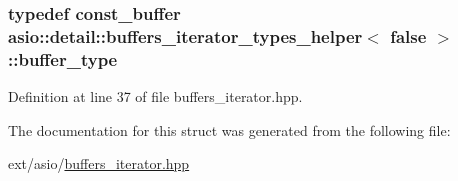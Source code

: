 \subsubsection[{buffer\+\_\+type}]{\setlength{\rightskip}{0pt plus 5cm}typedef {\bf const\+\_\+buffer} {\bf asio\+::detail\+::buffers\+\_\+iterator\+\_\+types\+\_\+helper}$<$ false $>$\+::{\bf buffer\+\_\+type}}\label{structasio_1_1detail_1_1buffers__iterator__types__helper_3_01false_01_4_ab4d0d844258fc4683e4c9922a99b963e}


Definition at line 37 of file buffers\+\_\+iterator.\+hpp.



The documentation for this struct was generated from the following file\+:\begin{DoxyCompactItemize}
\item 
ext/asio/\hyperlink{buffers__iterator_8hpp}{buffers\+\_\+iterator.\+hpp}\end{DoxyCompactItemize}
